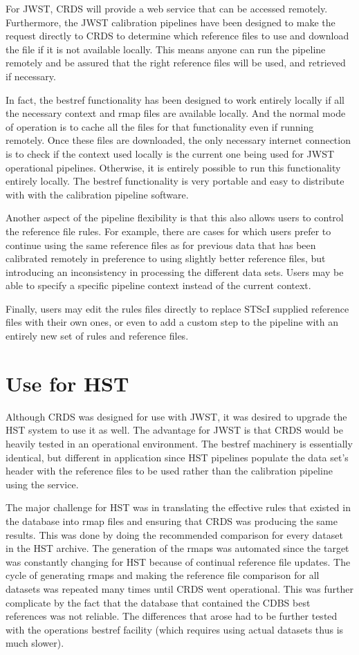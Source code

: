 \documentclass[final,authoryear,5p,times,twocolumn]{elsarticle}
\begin{document}
For JWST, CRDS will provide a web service that can be accessed
remotely. Furthermore, the JWST calibration pipelines have been designed to
make the request directly to CRDS to determine which reference files to use and
download the file if it is not available locally. This means anyone can run the
pipeline remotely and be assured that the right reference files will be used,
and retrieved if necessary.

In fact, the bestref functionality has been designed to work entirely locally
if all the necessary context and rmap files are available locally. And the
normal mode of operation is to cache all the files for that functionality even
if running remotely. Once these files are downloaded, the only necessary
internet connection is to check if the context used locally is the current one
being used for JWST operational pipelines. Otherwise, it is entirely possible
to run this functionality entirely locally. The bestref functionality is very
portable and easy to distribute with with the calibration pipeline software.

Another aspect of the pipeline flexibility is that this also allows users to
control the reference file rules. For example, there are cases for which users
prefer to continue using the same reference files as for previous data that has
been calibrated remotely in preference to using slightly better reference
files, but introducing an inconsistency in processing the different data
sets. Users may be able to specify a specific pipeline context instead of the
current context.

Finally, users may edit the rules files directly to replace STScI supplied
reference files with their own ones, or even to add a custom step to the
pipeline with an entirely new set of rules and reference files.

\section{Use for HST}

Although CRDS was designed for use with JWST, it was desired to upgrade the HST
system to use it as well. The advantage for JWST is that CRDS would be heavily
tested in an operational environment. The bestref machinery is essentially
identical, but different in application since HST pipelines populate the data
set's header with the reference files to be used rather than the calibration
pipeline using the service.

The major challenge for HST was in translating the effective rules that existed
in the database into rmap files and ensuring that CRDS was producing the same
results. This was done by doing the recommended comparison for every dataset
in the HST archive. The generation of the rmaps was automated since the target
was constantly changing for HST because of continual reference file
updates. The cycle of generating rmaps and making the reference file comparison
for all datasets was repeated many times until CRDS went operational. This was
further complicate by the fact that the database that contained the CDBS best
references was not reliable. The differences that arose had to be further
tested with the operations bestref facility (which requires using actual
datasets thus is much slower).
\end{document}
